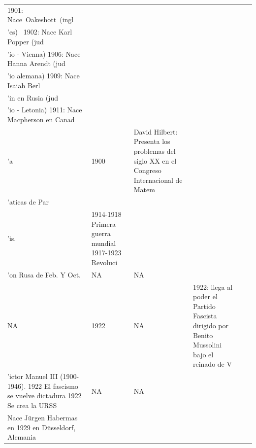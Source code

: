 \documentclass[
  letterpaper,
  DIV=11,
  numbers=noendperiod]{scrreprt}
\begin{document}
\begin{table}
\begin{tabular*}{\linewidth}{@{\extracolsep{\fill}}lllllc}
1901: Nace Oakeshott (ingl\\'es) 
1902: Nace Karl Popper (jud\\'io - Vienna)
1906: Nace Hanna Arendt (jud\\'io alemana)
1909: Nace Isaiah Berl\\'in en Rusia (jud\\'io - Letonia)
1911: Nace Macpherson en Canad\\'a & 1900  & David Hilbert:
Presenta los problemas del siglo XX en el Congreso Internacional de Matem\\'aticas de Par\\'is. & 1914-1918 Primera guerra mundial 
1917-1923 Revoluci\\'on Rusa de Feb. Y Oct. & NA & NA \\ 
NA & 1922 & NA & 1922: llega al poder el Partido Fascista dirigido por Benito Mussolini bajo el reinado de V\\'ictor Manuel III (1900-1946).
1922 El fascismo se vuelve dictadura
1922 Se crea la URSS & NA & NA \\ 
Nace J\"urgen Habermas en 1929 en D\"usseldorf, Alemania


\end{tabular*}
\end{table}
\end{document}

